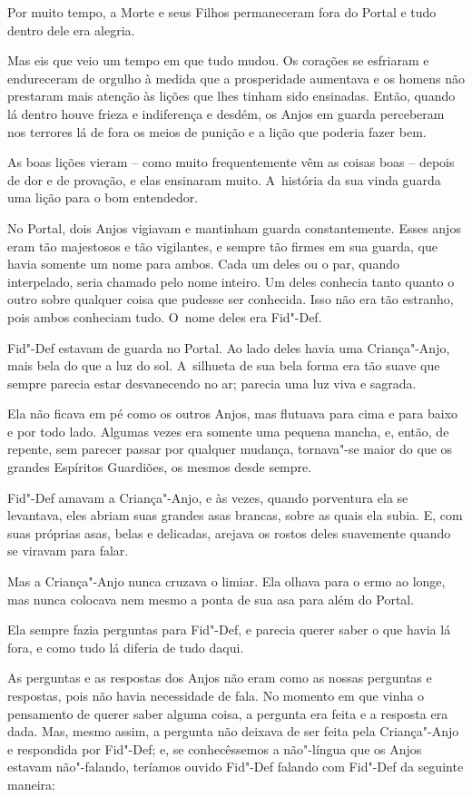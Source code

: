 Por muito tempo, a Morte e seus Filhos permaneceram fora do Portal e
tudo dentro dele era alegria.

Mas eis que veio um tempo em que tudo
mudou. Os corações se esfriaram e endureceram de orgulho à medida que a
prosperidade aumentava e os homens não prestaram mais atenção às lições que
lhes tinham sido ensinadas. Então, quando lá dentro houve frieza e
indiferença e desdém, os Anjos em guarda perceberam nos terrores lá de fora
os meios de punição e a lição que poderia fazer bem.

As boas lições vieram -- como muito frequentemente vêm as coisas boas --
depois de dor e de provação, e elas ensinaram muito. A~história da sua
vinda guarda uma lição para o bom entendedor.

No Portal, dois Anjos vigiavam e mantinham guarda constantemente. Esses
anjos eram tão majestosos e tão vigilantes, e sempre tão firmes em sua
guarda, que havia somente um nome para ambos. Cada um deles ou o par,
quando interpelado, seria chamado pelo nome inteiro. Um deles conhecia
tanto quanto o outro sobre qualquer coisa que pudesse ser conhecida.
Isso não era tão estranho, pois ambos conheciam tudo. O~nome deles era
Fid"-Def.

Fid"-Def estavam de guarda no Portal. Ao lado deles havia uma
Criança"-Anjo, mais bela do que a luz do sol. A~silhueta de sua bela
forma era tão suave que sempre parecia estar desvanecendo no ar; parecia
uma luz viva e sagrada.

Ela não ficava em pé como os outros Anjos, mas flutuava para cima e para
baixo e por todo lado. Algumas vezes era somente uma pequena mancha, e,
então, de repente, sem parecer passar por qualquer mudança,
tornava"-se maior do que os grandes Espíritos Guardiões, os
mesmos desde sempre.

Fid"-Def amavam a Criança"-Anjo, e às vezes, quando porventura ela se
levantava, eles abriam suas grandes asas brancas, sobre as quais ela
subia. E, com suas próprias asas, belas e delicadas, arejava os
rostos deles suavemente quando se viravam para falar.

Mas a Criança"-Anjo nunca cruzava o limiar. Ela olhava para o ermo ao
longe, mas nunca colocava nem mesmo a ponta de sua asa para além do
Portal.

Ela sempre fazia perguntas para Fid"-Def, e parecia querer saber o que
havia lá fora, e como tudo lá diferia de tudo daqui.

As perguntas e as respostas dos Anjos não eram como as nossas perguntas e
respostas, pois não havia necessidade de fala. No momento em que vinha o
pensamento de querer saber alguma coisa, a pergunta era feita e a
resposta era dada. Mas, mesmo assim, a pergunta não deixava de ser feita
pela Criança"-Anjo e respondida por Fid"-Def; e, se conhecêssemos a
não"-língua que os Anjos estavam não"-falando, teríamos ouvido Fid"-Def
falando com Fid"-Def da seguinte maneira:

